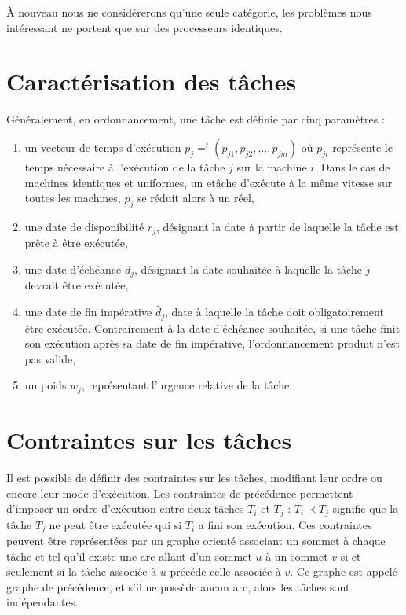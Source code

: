 \documentclass[a4paper,11pt]{report}
\begin{document}
À nouveau nous ne considérerons qu'une seule catégorie, les problèmes nous intéressant ne portent
que sur des processeurs identiques.

\section{Caractérisation des tâches}

Généralement, en ordonnancement, une tâche est définie par cinq paramètres :
\begin{enumerate}
    \item un vecteur de temps d'exécution $p_j = ^t(p_{j1}, p_{j2}, \dots, p_{jm})$ où $p_{ji}$
        représente le temps nécessaire à l'exécution de la tâche $j$ sur la machine $i$. Dans le cas
        de machines identiques et uniformes, un etâche d'exécute à la même vitesse sur toutes les
        machines, $p_j$ se réduit alors à un réel,
    \item une date de disponibilité $r_j$, désignant la date à partir de laquelle la tâche est prête
        à être exécutée,
    \item une date d'échéance $d_j$, désignant la date souhaitée à laquelle la tâche $j$ devrait
        être exécutée,
    \item une date de fin impérative $\widetilde{d_j}$, date à laquelle la tâche doit
        obligatoirement être exécutée. Contrairement à la date d'échéance souhaitée, si une tâche
        finit son exécution après sa date de fin impérative, l'ordonnancement produit n'est pas
        valide,
    \item un poids $w_j$, représentant l'urgence relative de la tâche.
\end{enumerate}

\section{Contraintes sur les tâches}

Il est possible de définir des contraintes sur les tâches, modifiant leur ordre ou encore  leur
mode d'exécution. Les contraintes de précédence permettent d'imposer un ordre d'exécution entre deux
tâches $T_i$ et $T_j$ : $T_i \prec T_j$ signifie que la tâche $T_j$ ne peut être exécutée qui si
$T_i$ a fini son exécution. Ces contraintes peuvent être représentées par un graphe orienté associant un
sommet à chaque tâche et tel qu'il existe une arc allant d'un sommet $u$ à un sommet $v$ si et
seulement si la tâche associée à $u$ précéde celle associée à $v$. Ce graphe est appelé graphe de
précédence, et s'il ne possède aucun arc, alors les tâches sont indépendantes.
\end{document}

